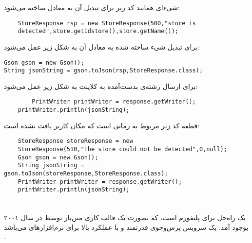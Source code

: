 \documentclass[oneside]{report}
\begin{document}
شیءای همانند کد زیر برای تبدیل آن به معادل 
{\normalsize{}}
ساخته می‌شود:
\begin{latin}
	\begin{verbatim}
	StoreResponse rsp = new StoreResponse(500,"store is 
	detected",store.getIdstore(),store.getName());
	\end{verbatim}
	
\end{latin}
	برای تبدیل شیء ساخته شده به معادل 
	{\normalsize{}}
	آن به شکل زیر عمل می‌شود:
	\begin{latin}
		\begin{verbatim}
Gson gson = new Gson();
String jsonString = gson.toJson(rsp,StoreResponse.class);
		\end{verbatim}
		
	\end{latin}
برای ارسال رشته‌ی 
			{\normalsize{}}
			بدست‌آمده به کلاینت به شکل زیر عمل می‌شود: 
\begin{latin}
	\begin{verbatim}
		PrintWriter printWriter = response.getWriter();
	printWriter.println(jsonString);
	\end{verbatim}
	
\end{latin}			
		
		قطعه کد زیر مربوط به زمانی است که مکان کاربر یافت نشده است:‌
	\begin{latin}
		\begin{verbatim}
	StoreResponse storeResponse = new 
	StoreResponse(510,"The store could not be detected",0,null);
	Gson gson = new Gson();
	String jsonString = gson.toJson(storeResponse,StoreResponse.class);
	PrintWriter printWriter = response.getWriter();
	printWriter.println(jsonString);
		\end{verbatim}
		
	\end{latin}		
	
	\section{{\large{}}}
	{\normalsize {}}
	یک راه‌حل 
	{\normalsize {}}
	برای پلتفورم 
	{\normalsize {}} 
	است،  که بصورت یک قالب کاری متن‌باز 
	توسط 
	{\normalsize {}} 
	در سال ۲۰۰۱ بوجود آمد. 
	{\normalsize {}} 
	یک سرویس پرس‌وجوی قدرتمند و با عملکرد بالا برای نرم‌افزارهای 
	{\normalsize {}} 
	می‌باشد
		\cite{hibernate}
	. 
	
\end{document}

